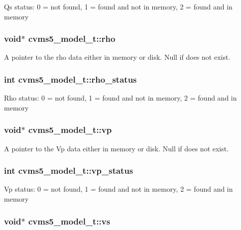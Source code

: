 Qs status\+: 0 = not found, 1 = found and not in memory, 2 = found and in memory \hypertarget{structcvms5__model__t_a9b06d2bca8552757e25f9c932389feea}{
\subsubsection[{rho}]{\setlength{\rightskip}{0pt plus 5cm}void$\ast$ cvms5\+\_\+model\+\_\+t\+::rho}}\label{structcvms5__model__t_a9b06d2bca8552757e25f9c932389feea}
A pointer to the rho data either in memory or disk. Null if does not exist. \hypertarget{structcvms5__model__t_a62d69a02eee534fd95f678fd3f1031cf}{
\subsubsection[{rho\+\_\+status}]{\setlength{\rightskip}{0pt plus 5cm}int cvms5\+\_\+model\+\_\+t\+::rho\+\_\+status}}\label{structcvms5__model__t_a62d69a02eee534fd95f678fd3f1031cf}
Rho status\+: 0 = not found, 1 = found and not in memory, 2 = found and in memory \hypertarget{structcvms5__model__t_a0195bcc697749db53879823f41d026bf}{
\subsubsection[{vp}]{\setlength{\rightskip}{0pt plus 5cm}void$\ast$ cvms5\+\_\+model\+\_\+t\+::vp}}\label{structcvms5__model__t_a0195bcc697749db53879823f41d026bf}
A pointer to the Vp data either in memory or disk. Null if does not exist. \hypertarget{structcvms5__model__t_ab42d17208dc3406887ed8fbc09150442}{
\subsubsection[{vp\+\_\+status}]{\setlength{\rightskip}{0pt plus 5cm}int cvms5\+\_\+model\+\_\+t\+::vp\+\_\+status}}\label{structcvms5__model__t_ab42d17208dc3406887ed8fbc09150442}
Vp status\+: 0 = not found, 1 = found and not in memory, 2 = found and in memory \hypertarget{structcvms5__model__t_a26cacd56b7e4edc37a1b21f1a295fa43}{
\subsubsection[{vs}]{\setlength{\rightskip}{0pt plus 5cm}void$\ast$ cvms5\+\_\+model\+\_\+t\+::vs}}\label{structcvms5__model__t_a26cacd56b7e4edc37a1b21f1a295fa43}
